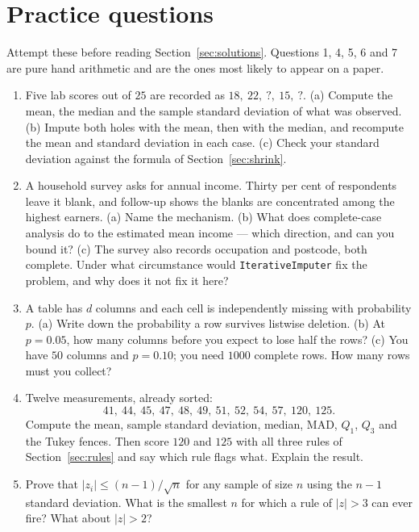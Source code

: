 \documentclass[11pt]{article}
\begin{document}
\section{Practice questions}

Attempt these before reading Section~\ref{sec:solutions}. Questions 1, 4, 5, 6
and 7 are pure hand arithmetic and are the ones most likely to appear on a
paper.

\begin{enumerate}[leftmargin=*]
  \item\label{q:impute} Five lab scores out of $25$ are recorded as
    $18,\ 22,\ ?,\ 15,\ ?$. (a) Compute the mean, the median and the sample
    standard deviation of what was observed. (b) Impute both holes with the
    mean, then with the median, and recompute the mean and standard deviation
    in each case. (c) Check your standard deviation against the formula of
    Section~\ref{sec:shrink}.

  \item\label{q:mech} A household survey asks for annual income. Thirty per
    cent of respondents leave it blank, and follow-up shows the blanks are
    concentrated among the highest earners. (a) Name the mechanism. (b) What
    does complete-case analysis do to the estimated mean income --- which
    direction, and can you bound it? (c) The survey also records occupation and
    postcode, both complete. Under what circumstance would
    \texttt{IterativeImputer} fix the problem, and why does it not fix it here?

  \item\label{q:listwise} A table has $d$ columns and each cell is
    independently missing with probability $p$. (a) Write down the probability
    a row survives listwise deletion. (b) At $p = 0.05$, how many columns
    before you expect to lose half the rows? (c) You have $50$ columns and
    $p = 0.10$; you need $1000$ complete rows. How many rows must you collect?

  \item\label{q:rules} Twelve measurements, already sorted:
    \[ 41,\ 44,\ 45,\ 47,\ 48,\ 49,\ 51,\ 52,\ 54,\ 57,\ 120,\ 125. \]
    Compute the mean, sample standard deviation, median, MAD, $Q_1$, $Q_3$ and
    the Tukey fences. Then score $120$ and $125$ with all three rules of
    Section~\ref{sec:rules} and say which rule flags what. Explain the result.

  \item\label{q:ceiling} Prove that $|z_i| \le (n-1)/\sqrt{n}$ for any sample
    of size $n$ using the $n-1$ standard deviation. What is the smallest $n$
    for which a rule of $|z| > 3$ can ever fire? What about $|z| > 2$?


\end{enumerate}
\end{document}

